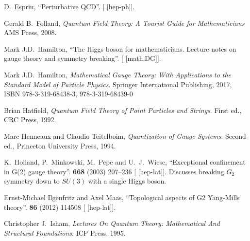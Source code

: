 \begin{thebibliography}{99}
D.~Espriu,
``Perturbative QCD''.
[ [hep-ph]].

Gerald B.~Folland,
\textit{Quantum Field Theory: A Tourist Guide for Mathematicians}
AMS Press, 2008.

Mark J.D.\ Hamilton,
``The Higgs boson for mathematicians. Lecture notes on gauge theory and symmetry breaking''.
[ [math.DG]].

Mark J.D.\ Hamilton,
\textit{Mathematical Gauge Theory: With Applications to the Standard Model of Particle Physics}.
Springer International Publishing, 2017,
ISBN 978-3-319-68438-3, 978-3-319-68439-0
{\tt{}}

Brian Hatfield,
\textit{Quantum Field Theory of Point Particles and Strings}.
First ed., CRC Press, 1992.

Marc Henneaux and Claudio Teitelboim,
\textit{Quantization of Gauge Systems}.
Second ed., Princeton University Press, 1994.

K.~Holland, P.~Minkowski, M.~Pepe and U.~J.~Wiese,
``Exceptional confinement in G(2) gauge theory''.
 \textbf{668} (2003) 207--236
{\tt{}}
[ [hep-lat]].
Discusses breaking $G_{2}$ symmetry down to $SU(3)$ with a single Higgs boson.

Ernst-Michael Ilgenfritz and Axel Maas,
``Topological aspects of G2 Yang-Mills theory''.
 \textbf{86} (2012) 114508
{\tt{}}
[ [hep-lat]].

Christopher J.\ Isham,
\textit{Lectures On Quantum Theory: Mathematical And Structural Foundations}.
ICP Press, 1995.



\end{thebibliography}
